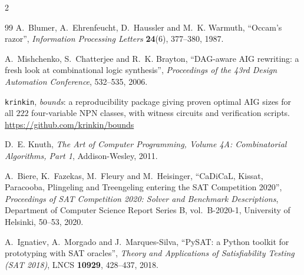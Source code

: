 \documentclass[11pt]{article}
\begin{document}
\begin{multicols}{2}
\begin{thebibliography}{99}
A.~Blumer, A.~Ehrenfeucht, D.~Haussler and M.~K. Warmuth,
``Occam's razor'',
\emph{Information Processing Letters} \textbf{24}(6), 377--380, 1987.

A.~Mishchenko, S.~Chatterjee and R.~K. Brayton,
``DAG-aware AIG rewriting: a fresh look at combinational logic
synthesis'',
\emph{Proceedings of the 43rd Design Automation Conference}, 532--535,
2006.

\texttt{krinkin},
\emph{bounds}: a reproducibility package giving proven optimal AIG
sizes for all $222$ four-variable NPN classes, with witness circuits
and verification scripts.
\url{https://github.com/krinkin/bounds}

D.~E. Knuth,
\emph{The Art of Computer Programming, Volume 4A: Combinatorial
Algorithms, Part 1},
Addison-Wesley, 2011.

A.~Biere, K.~Fazekas, M.~Fleury and M.~Heisinger,
``CaDiCaL, Kissat, Paracooba, Plingeling and Treengeling entering the
SAT Competition 2020'',
\emph{Proceedings of SAT Competition 2020: Solver and Benchmark
Descriptions}, Department of Computer Science Report Series B,
vol.\ B-2020-1, University of Helsinki, 50--53, 2020.

A.~Ignatiev, A.~Morgado and J.~Marques-Silva,
``PySAT: a Python toolkit for prototyping with SAT oracles'',
\emph{Theory and Applications of Satisfiability Testing (SAT 2018)},
LNCS \textbf{10929}, 428--437, 2018.

\end{thebibliography}
\end{multicols}
\endgroup
\end{document}
